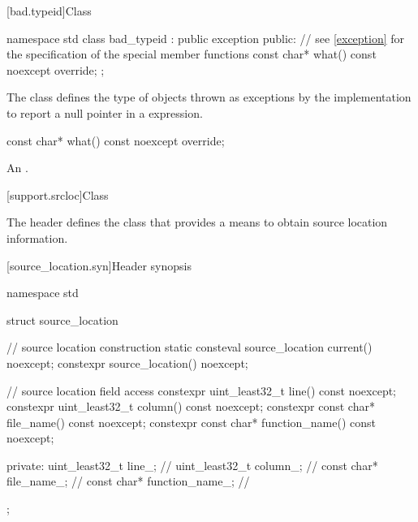 [bad.typeid]{Class }

%
%
\begin{codeblock}
namespace std {
  class bad_typeid : public exception {
  public:
    // see \ref{exception} for the specification of the special member functions
    const char* what() const noexcept override;
  };
}
\end{codeblock}

\pnum
The class
defines the type of objects
thrown as exceptions by the implementation to report a null pointer
in a
expression.

%
\begin{itemdecl}
const char* what() const noexcept override;
\end{itemdecl}

\begin{itemdescr}
\pnum
\returns
An  \ntbs{}.
\end{itemdescr}

[support.srcloc]{Class }

The header  defines the class  that provides a means to obtain source location information.

[source_location.syn]{Header  synopsis}
%
%

\begin{codeblock}
namespace std {
  struct source_location {
    // source location construction
    static consteval source_location current() noexcept;
    constexpr source_location() noexcept;

    // source location field access
    constexpr uint_least32_t line() const noexcept;
    constexpr uint_least32_t column() const noexcept;
    constexpr const char* file_name() const noexcept;
    constexpr const char* function_name() const noexcept;

  private:
    uint_least32_t line_;               // \expos
    uint_least32_t column_;             // \expos
    const char* file_name_;             // \expos
    const char* function_name_;         // \expos
  };
}
\end{codeblock}

